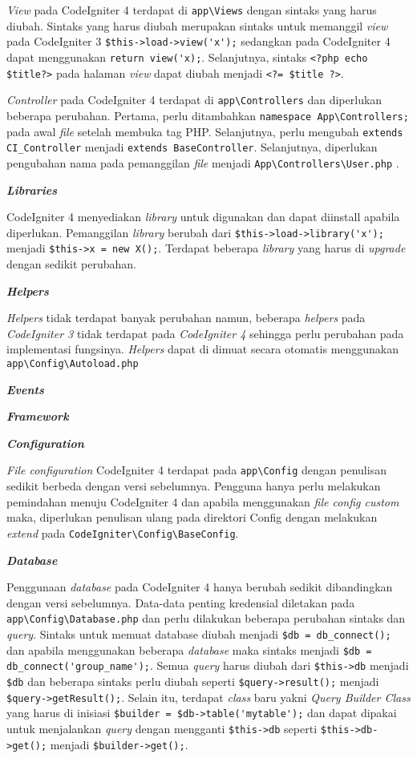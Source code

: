 \textit{View} pada CodeIgniter 4 terdapat di \verb|app\Views| dengan sintaks yang harus diubah. Sintaks yang harus diubah merupakan sintaks untuk memanggil \textit{view} pada CodeIgniter 3 \verb|$this->load->view('x');| sedangkan pada CodeIgniter 4 dapat menggunakan \verb|return view('x);|. Selanjutnya, sintaks \verb|<?php echo $title?>| pada halaman \textit{view} dapat diubah menjadi
 \verb|<?= $title ?>|. 
 
\textit{Controller} pada CodeIgniter 4 terdapat di \verb|app\Controllers| dan diperlukan beberapa perubahan. Pertama, perlu ditambahkan \verb|namespace App\Controllers;| pada awal \textit{file} setelah membuka tag PHP. Selanjutnya, perlu mengubah \verb|extends CI_Controller| menjadi \verb|extends BaseController|. Selanjutnya, diperlukan pengubahan nama pada pemanggilan \textit{file} menjadi \verb|App\Controllers\User.php| .
 
\textbf{\textit{Libraries}}
 
CodeIgniter 4 menyediakan \textit{library} untuk digunakan dan dapat diinstall apabila diperlukan. Pemanggilan \textit{library} berubah dari \verb|$this->load->library('x');| menjadi \verb|$this->x = new X();|. Terdapat beberapa \textit{library} yang harus di \textit{upgrade} dengan sedikit perubahan.
 

\textbf{\textit{Helpers}}
 
\textit{Helpers} tidak terdapat banyak perubahan namun, beberapa \textit{helpers} pada \textit{CodeIgniter 3} tidak terdapat pada \textit{CodeIgniter 4} sehingga perlu perubahan pada implementasi fungsinya. \textit{Helpers} dapat di dimuat secara otomatis menggunakan \verb|app\Config\Autoload.php|


\textbf{\textit{Events}}


\textbf{\textit{Framework}}


\textbf{\textit{Configuration}}

\textit{File configuration} CodeIgniter 4 terdapat pada \verb|app\Config| dengan penulisan sedikit berbeda dengan versi sebelumnya. Pengguna hanya perlu melakukan pemindahan menuju CodeIgniter 4 dan apabila menggunakan \textit{file config custom} maka, diperlukan penulisan ulang pada direktori Config dengan melakukan \textit{extend} pada \verb|CodeIgniter\Config\BaseConfig|.   

\textbf{\textit{Database}}

Penggunaan \textit{database} pada CodeIgniter 4 hanya berubah sedikit dibandingkan dengan versi sebelumnya. Data-data penting kredensial diletakan pada \verb|app\Config\Database.php| dan perlu dilakukan beberapa perubahan sintaks dan \textit{query}. Sintaks untuk memuat database diubah menjadi \verb|$db = db_connect();| dan  apabila menggunakan beberapa \textit{database} maka sintaks menjadi \verb|$db = db_connect('group_name');|. Semua \textit{query} harus diubah dari \verb|$this->db| menjadi \verb|$db| dan beberapa sintaks perlu diubah seperti \verb|$query->result();| menjadi \verb|$query->getResult();|. Selain itu, terdapat \textit{class} baru yakni \textit{Query Builder Class} yang harus di inisiasi \verb|$builder = $db->table('mytable');| dan dapat dipakai untuk menjalankan \textit{query} dengan mengganti \verb|$this->db| seperti \verb|$this->db->get();| menjadi \verb|$builder->get();|.

